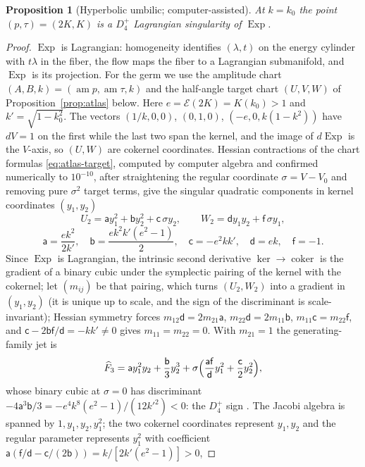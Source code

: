 \documentclass[11pt]{article}
\newtheorem{proposition}[theorem]{Proposition}
\theoremstyle{remark}
\newcommand{\am}{\operatorname{am}}
\newcommand{\epsi}{\mathcal{E}}
\newcommand{\Exp}{\operatorname{Exp}}
\begin{document}
\begin{proposition}[Hyperbolic umbilic; computer-assisted]\label{prop:d4}
At $k=k_0$ the point $(p,\tau)=(2K,K)$ is a $D_4^+$ Lagrangian singularity
of $\Exp$.
\end{proposition}
\begin{proof}
$\Exp$ is Lagrangian: homogeneity identifies $(\lambda,t)$ on the energy
cylinder with $t\lambda$ in the fiber, the flow maps the fiber to a
Lagrangian submanifold, and $\Exp$ is its projection.  For the germ we use
the amplitude chart $(A,B,k)=(\am p,\am\tau,k)$ and the half-angle target
chart $(U,V,W)$ of Proposition~\ref{prop:atlas} below.  Here $e=\epsi(2K)=K(k_0)>1$ and $k'=\sqrt{1-k_0^2}$.  The vectors
$(1/k,0,0)$, $(0,1,0)$, $(-e,0,k(1-k^2))$ have $dV=1$ on the first while the
last two span the kernel, and the image of $d\Exp$ is the $V$-axis, so
$(U,W)$ are cokernel coordinates.  Hessian contractions of the chart
formulas \eqref{eq:atlas-target}, computed by computer algebra and
confirmed numerically to $10^{-10}$, after straightening
the regular coordinate $\sigma=V-V_0$ and removing pure $\sigma^2$ target
terms, give the singular quadratic components in kernel coordinates
$(y_1,y_2)$
\[
 U_2=\mathsf a y_1^2+\mathsf b y_2^2+\mathsf c\,\sigma y_2,\qquad
 W_2=\mathsf d y_1y_2+\mathsf f\,\sigma y_1,
\]
\[
 \mathsf a=\frac{ek^2}{2k'},\quad \mathsf b=\frac{ek^2k'(e^2-1)}2,\quad
 \mathsf c=-e^2kk',\quad \mathsf d=ek,\quad \mathsf f=-1 .
\]
Since $\Exp$ is Lagrangian, the intrinsic second derivative
$\ker\to\operatorname{coker}$ is the gradient of a binary cubic under the
symplectic pairing of the kernel with the cokernel; let $(m_{ij})$ be that
pairing, which turns $(U_2,W_2)$ into a gradient in $(y_1,y_2)$ (it is
unique up to scale, and the sign of the discriminant is scale-invariant);
Hessian symmetry forces $m_{12}\mathsf d=2m_{21}\mathsf a$,
$m_{22}\mathsf d=2m_{11}\mathsf b$, $m_{11}\mathsf c=m_{22}\mathsf f$, and
$\mathsf c-2\mathsf b\mathsf f/\mathsf d=-kk'\ne0$ gives $m_{11}=m_{22}=0$.
With $m_{21}=1$ the generating-family jet is
\[
 \widehat F_3=\mathsf a y_1^2y_2+\frac{\mathsf b}3y_2^3
 +\sigma\Bigl(\frac{\mathsf a\mathsf f}{\mathsf d}y_1^2+\frac{\mathsf c}2y_2^2\Bigr),
\]
whose binary cubic at $\sigma=0$ has discriminant
$-4\mathsf a^3\mathsf b/3=-e^4k^8(e^2-1)/(12k'^2)<0$: the $D_4^+$ sign
\cite[Ch.~5, \S2.3, p.~97]{ArnoldGivental1990Symplectic}.
The Jacobi algebra is spanned by
$1,y_1,y_2,y_1^2$; the two cokernel coordinates represent $y_1,y_2$ and
the regular parameter represents $y_1^2$ with
coefficient $\mathsf a(\mathsf f/\mathsf d-\mathsf c/(2\mathsf b))=k/[2k'(e^2-1)]>0$,

\end{proof}
\end{document}
